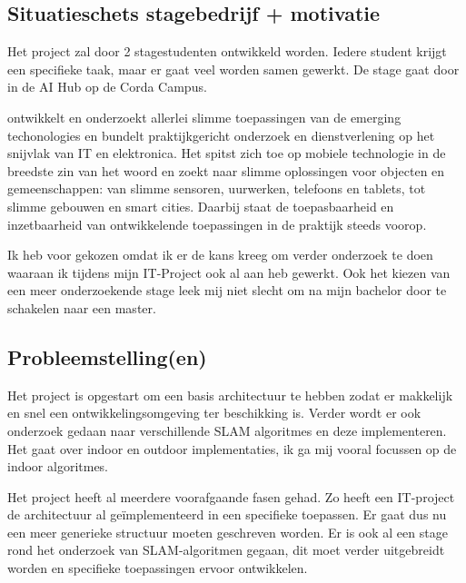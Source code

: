 \subsection{Situatieschets stagebedrijf + motivatie}
  Het project zal door 2 stagestudenten ontwikkeld worden. Iedere student krijgt een specifieke taak, maar er gaat veel worden samen gewerkt. De stage gaat door in de AI Hub op de Corda Campus.\par
  \stagebedrijf{} ontwikkelt en onderzoekt allerlei slimme toepassingen van de emerging techonologies en bundelt praktijkgericht onderzoek en dienstverlening op het snijvlak van IT en elektronica. Het spitst zich toe op mobiele technologie in de breedste zin van het woord en zoekt naar slimme oplossingen voor objecten en gemeenschappen: van slimme sensoren, uurwerken, telefoons en tablets, tot slimme gebouwen en smart cities. Daarbij staat de toepasbaarheid en inzetbaarheid van ontwikkelende toepassingen in de praktijk steeds voorop.\par
  Ik heb voor \stagebedrijf{} gekozen omdat ik er de kans kreeg om verder onderzoek te doen waaraan ik tijdens mijn IT-Project ook al aan heb gewerkt. Ook het kiezen van een meer onderzoekende stage leek mij niet slecht om na mijn bachelor door te schakelen naar een master.

\newpage

\subsection{Probleemstelling(en)}
  Het project is opgestart om een basis architectuur te hebben zodat er makkelijk en snel een ontwikkelingsomgeving ter beschikking is. Verder wordt er ook onderzoek gedaan naar verschillende SLAM algoritmes en deze implementeren. Het gaat over indoor en outdoor implementaties, ik ga mij vooral focussen op de indoor algoritmes.\par
  Het project heeft al meerdere voorafgaande fasen gehad. Zo heeft een IT-project de architectuur al geïmplementeerd in een specifieke toepassen. Er gaat dus nu een meer generieke structuur moeten geschreven worden. Er is ook al een stage rond het onderzoek van SLAM-algoritmen gegaan, dit moet verder uitgebreidt worden en specifieke toepassingen ervoor ontwikkelen.


